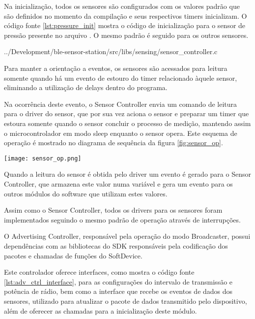 Na inicialização, todos os sensores são configurados com os valores padrão que
são definidos no momento da compilação e seus respectivos timers inicializam. O
código fonte \ref{lst:pressure_init} mostra o código de inicialização para o
sensor de pressão presente no arquivo . O mesmo
padrão é seguido para os outros sensores.

\begin{minipage}{0.95\linewidth} 
 
{../Development/ble-sensor-station/src/libs/sensing/sensor_controller.c}
\end{minipage}

Para manter a orientação a eventos, os sensores são acessados para
leitura somente quando há um evento de estouro do timer relacionado àquele
sensor, eliminando a utilização de delays dentro do programa. 

Na ocorrência deste evento, o Sensor Controller envia um comando de
leitura para o driver do sensor, que por sua vez aciona o sensor e
preparar um timer que estoura somente quando o sensor concluir o processo
de medição, mantendo assim o microcontrolador em modo sleep enquanto o sensor
opera. Este esquema de operação é mostrado no diagrama de sequência da figura
\ref{fig:sensor_op}.

\begin{center}
	\centering 
	\texttt{[image: sensor\_op.png]}
	\label{fig:sensor_op}
\end{center} 

Quando a leitura do sensor é obtida pelo driver um evento é gerado para o Sensor
Controller, que armazena este valor numa variável e gera um evento para os
outros módulos do software que utilizam estes valores.

Assim como o Sensor Controller, todos os drivers para os sensores foram
implementados seguindo o mesmo padrão de operação através de interrupções.


O Advertising Controller, responsável pela operação do modo Broadcaster, possui
dependências com as bibliotecas do SDK responsáveis pela codificação dos pacotes
e chamadas de funções do SoftDevice.

Este controlador oferece interfaces, como mostra o código fonte
\ref{lst:adv_ctrl_interface}, para as configurações do intervalo de transmissão
e potência de rádio, bem como a interface que recebe os eventos de dados dos
sensores, utilizado para atualizar o pacote de dados transmitido pelo
dispositivo, além de oferecer as chamadas para a inicialização deste módulo.

